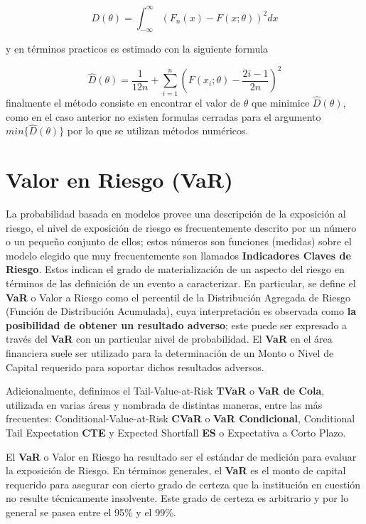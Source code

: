 \documentclass[10pt,]{article}
\begin{document}
\[D(\theta)=\int_{-\infty}^{\infty}(F_n(x)-F(x;\theta))^2dx\]

y en términos practicos es estimado con la siguiente formula

\[\hat{D}(\theta)=\frac{1}{12n}+\sum_{i=1}^{n}\left(F(x_i ;\theta)-\frac{2i-1}{2n}\right)^2\]
finalmente el método consiste en encontrar el valor de \(\theta\) que
minimice \(\hat{D}(\theta)\), como en el caso anterior no existen
formulas cerradas para el argumento \(min\{\hat{D}(\theta)\}\) por lo
que se utilizan métodos numéricos.

\hypertarget{valor-en-riesgo-var}{%
\section{Valor en Riesgo (VaR)}\label{valor-en-riesgo-var}}

La probabilidad basada en modelos provee una descripción de la
exposición al riesgo, el nivel de exposición de riesgo es frecuentemente
descrito por un número o un pequeño conjunto de ellos; estos números son
funciones (medidas) sobre el modelo elegido que muy frecuentemente son
llamados \textbf{Indicadores Claves de Riesgo}. Estos indican el grado
de materialización de un aspecto del riesgo en términos de las
definición de un evento a caracterizar. En particular, se define el
\textbf{VaR} o Valor a Riesgo como el percentil de la Distribución
Agregada de Riesgo (Función de Distribución Acumulada), cuya
interpretación es observada como \textbf{la posibilidad de obtener un
resultado adverso}; este puede ser expresado a través del \textbf{VaR}
con un particular nivel de probabilidad. El \textbf{VaR} en el área
financiera suele ser utilizado para la determinación de un Monto o Nivel
de Capital requerido para soportar dichos resultados adversos.

Adicionalmente, definimos el Tail-Value-at-Risk \textbf{TVaR} o
\textbf{VaR de Cola}, utilizada en varias áreas y nombrada de distintas
maneras, entre las más frecuentes: Conditional-Value-at-Risk
\textbf{CVaR} o \textbf{VaR Condicional}, Conditional Tail Expectation
\textbf{CTE} y Expected Shortfall \textbf{ES} o Expectativa a Corto
Plazo.

El \textbf{VaR} o Valor en Riesgo ha resultado ser el estándar de
medición para evaluar la exposición de Riesgo. En términos generales, el
\textbf{VaR} es el monto de capital requerido para asegurar con cierto
grado de certeza que la institución en cuestión no resulte técnicamente
insolvente. Este grado de certeza es arbitrario y por lo general se
pasea entre el 95\% y el 99\%.
\end{document}
